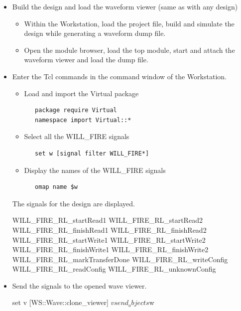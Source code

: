 \begin{itemize}
\item Build the design and load the waveform viewer (same as with any design)

\begin{itemize}
\item Within the Workstation, load the project file, build and
simulate the design while generating a waveform dump file.

\item Open the module browser, load the top module, start and attach
the waveform viewer and load the dump file.
\end{itemize}

\item Enter the Tcl commands  in the command window of  the
Workstation.

\begin{itemize}
\item  Load and import the Virtual package
\begin{verbatim}
   package require Virtual
   namespace import Virtual::*
\end{verbatim}

\item Select all the WILL\_FIRE signals
\begin{verbatim}
   set w [signal filter WILL_FIRE*]
\end{verbatim}

\item Display the names of the WILL\_FIRE signals

\begin{verbatim}
   omap name $w
\end{verbatim}

\end{itemize}



The  signals for the  design are displayed.

\begin{codebox}
WILL_FIRE_RL_startRead1 WILL_FIRE_RL_startRead2
WILL_FIRE_RL_finishRead1 WILL_FIRE_RL_finishRead2
WILL_FIRE_RL_startWrite1 WILL_FIRE_RL_startWrite2
WILL_FIRE_RL_finishWrite1 WILL_FIRE_RL_finishWrite2
WILL_FIRE_RL_markTransferDone WILL_FIRE_RL_writeConfig
WILL_FIRE_RL_readConfig WILL_FIRE_RL_unknownConfig
\end{codebox}

\item Send the  signals to the opened wave viewer.

\begin{codebox}
   set v [WS::Wave::clone_viewer]
   $v send_objects $w
\end{codebox}

\end{itemize}



